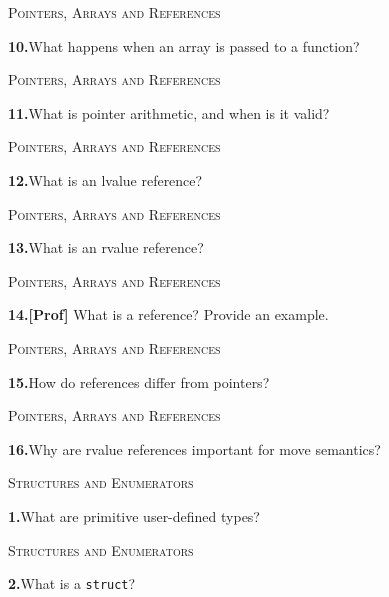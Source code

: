 \documentclass[11pt,a4paper]{article}
\newenvironment{questionblock}{%
  \begin{minipage}[t][0.455\textheight][t]{\textwidth}%
  \raggedright\small
}{%
  \vfill
  \end{minipage}%
}
\newcommand{\sectionlabel}[1]{\textsc{#1}\par\vspace{0.35em}}
\newcommand{\questionnumber}[1]{\textbf{#1.}\enspace}
\begin{document}
\newpage
\begin{questionblock}
\sectionlabel{Pointers, Arrays and References}
\questionnumber{10}What happens when an array is passed to a function?\par
\end{questionblock}
\vspace*{0.04\textheight}
\begin{questionblock}
\sectionlabel{Pointers, Arrays and References}
\questionnumber{11}What is pointer arithmetic, and when is it valid?\par
\end{questionblock}
\newpage
\begin{questionblock}
\sectionlabel{Pointers, Arrays and References}
\questionnumber{12}What is an lvalue reference?\par
\end{questionblock}
\vspace*{0.04\textheight}
\begin{questionblock}
\sectionlabel{Pointers, Arrays and References}
\questionnumber{13}What is an rvalue reference?\par
\end{questionblock}
\newpage
\begin{questionblock}
\sectionlabel{Pointers, Arrays and References}
\questionnumber{14}\textbf{[Prof]} What is a reference? Provide an example.\par
\end{questionblock}
\vspace*{0.04\textheight}
\begin{questionblock}
\sectionlabel{Pointers, Arrays and References}
\questionnumber{15}How do references differ from pointers?\par
\end{questionblock}
\newpage
\begin{questionblock}
\sectionlabel{Pointers, Arrays and References}
\questionnumber{16}Why are rvalue references important for move semantics?\par

\end{questionblock}
\vspace*{0.04\textheight}
\begin{questionblock}
\sectionlabel{Structures and Enumerators}
\questionnumber{1}What are primitive user-defined types?\par
\end{questionblock}
\newpage
\begin{questionblock}
\sectionlabel{Structures and Enumerators}
\questionnumber{2}What is a \verb|struct|?\par
\end{questionblock}
\end{document}

